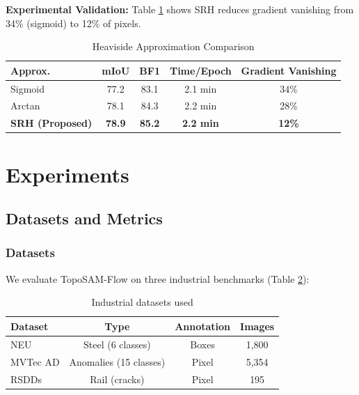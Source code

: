 \documentclass[12pt, a4paper]{article}
\begin{document}
\textbf{Experimental Validation:} Table \ref{tab:heaviside_comparison} shows SRH reduces gradient vanishing from 34\% (sigmoid) to 12\% of pixels.

\begin{table}[h]
\centering
\caption{Heaviside Approximation Comparison}
\label{tab:heaviside_comparison}
\begin{tabular}{lcccc}
\toprule
\textbf{Approx.} & \textbf{mIoU} & \textbf{BF1} & \textbf{Time/Epoch} & \textbf{Gradient Vanishing} \\
\midrule
Sigmoid & 77.2 & 83.1 & 2.1 min & 34\% \\
Arctan & 78.1 & 84.3 & 2.2 min & 28\% \\
\textbf{SRH (Proposed)} & \textbf{78.9} & \textbf{85.2} & \textbf{2.2 min} & \textbf{12\%} \\
\bottomrule
\end{tabular}
\end{table}

\section{Experiments}
\label{sec:experiments}

\subsection{Datasets and Metrics}
\label{subsec:datasets_metrics}

\subsubsection{Datasets}

We evaluate TopoSAM-Flow on three industrial benchmarks (Table \ref{tab:datasets}):

\begin{table}[h]
\centering
\caption{Industrial datasets used}
\label{tab:datasets}
\begin{tabular}{lccc}
\toprule
\textbf{Dataset} & \textbf{Type} & \textbf{Annotation} & \textbf{Images} \\
\midrule
NEU \cite{neu2024} & Steel (6 classes) & Boxes & 1,800 \\
MVTec AD \cite{mvtec2024} & Anomalies (15 classes) & Pixel & 5,354 \\
RSDDs \cite{rsdds2024} & Rail (cracks) & Pixel & 195 \\
\bottomrule
\end{tabular}
\end{table}
\end{document}
